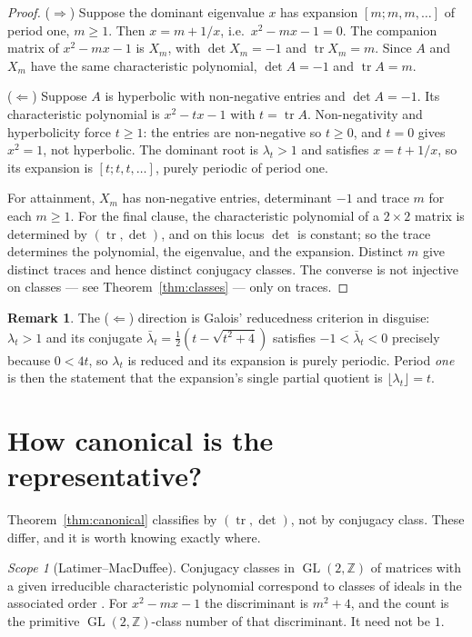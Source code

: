 \documentclass[11pt,a4paper]{article}
\theoremstyle{definition}
\newtheorem{remark}[theorem]{Remark}
\theoremstyle{remark}
\newtheorem{scope}[theorem]{Scope}
\newcommand{\GL}{\operatorname{GL}}
\newcommand{\Z}{\mathbb{Z}}
\newcommand{\tr}{\operatorname{tr}}
\begin{document}
\begin{proof}
($\Rightarrow$) Suppose the dominant eigenvalue $x$ has expansion $[m;m,m,\dots]$ of period
one, $m\ge1$. Then $x=m+1/x$, i.e.\ $x^2-mx-1=0$. The companion matrix of $x^2-mx-1$ is
$X_m$, with $\det X_m=-1$ and $\tr X_m=m$. Since $A$ and $X_m$ have the same characteristic
polynomial, $\det A=-1$ and $\tr A=m$.

($\Leftarrow$) Suppose $A$ is hyperbolic with non-negative entries and $\det A=-1$. Its
characteristic polynomial is $x^2-tx-1$ with $t=\tr A$. Non-negativity and hyperbolicity force
$t\ge1$: the entries are non-negative so $t\ge0$, and $t=0$ gives $x^2=1$, not hyperbolic.
The dominant root is $\lambda_t>1$ and satisfies $x=t+1/x$, so its expansion is
$[t;t,t,\dots]$, purely periodic of period one.

For attainment, $X_m$ has non-negative entries, determinant $-1$ and trace $m$ for each
$m\ge1$. For the final clause, the characteristic polynomial of a $2\times2$ matrix is
determined by $(\tr,\det)$, and on this locus $\det$ is constant; so the trace determines the
polynomial, the eigenvalue, and the expansion. Distinct $m$ give distinct traces and hence
distinct conjugacy classes. The converse is not injective on classes --- see
Theorem~\ref{thm:classes} --- only on traces.
\end{proof}

\begin{remark}
The ($\Leftarrow$) direction is Galois' reducedness criterion in disguise:
$\lambda_t>1$ and its conjugate $\bar\lambda_t=\tfrac12(t-\sqrt{t^2+4})$ satisfies
$-1<\bar\lambda_t<0$ precisely because $0<4t$, so $\lambda_t$ is reduced and its expansion is
purely periodic. Period \emph{one} is then the statement that the expansion's single partial
quotient is $\lfloor\lambda_t\rfloor=t$.
\end{remark}

\section{How canonical is the representative?}\label{sec:classes}

Theorem~\ref{thm:canonical} classifies by $(\tr,\det)$, not by conjugacy class. These differ,
and it is worth knowing exactly where.

\begin{scope}[Latimer--MacDuffee]\label{sc:latimer}
Conjugacy classes in $\GL(2,\Z)$ of matrices with a given irreducible characteristic
polynomial correspond to classes of ideals in the associated order
\cite{LatimerMacDuffee,Taussky}. For $x^2-mx-1$ the discriminant is $m^2+4$, and the count is
the primitive $\GL(2,\Z)$-class number of that discriminant. It need not be $1$.
\end{scope}
\end{document}
